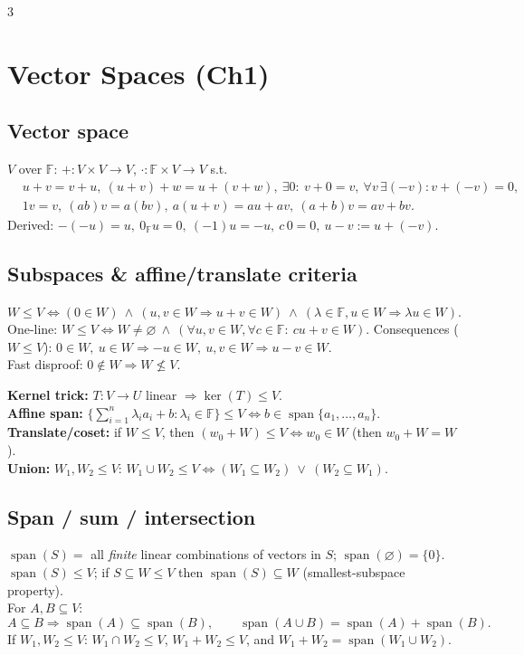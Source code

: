 \documentclass[10pt]{article}
\newcommand{\F}{\mathbb{F}}
\newcommand{\Ker}{\operatorname{ker}}
\newcommand{\spann}{\operatorname{span}}
\begin{document}
\begin{multicols}{3}
\footnotesize
\raggedcolumns

\section*{Vector Spaces (Ch1)}

\subsection*{Vector space}
$V$ over $\F$: $+:V\times V\to V$, $\cdot:\F\times V\to V$ s.t.
\[
\begin{aligned}
&u+v=v+u,\ (u+v)+w=u+(v+w),\ \exists 0:\ v+0=v,\ \forall v\,\exists(-v):v+(-v)=0,\\
&1v=v,\ (ab)v=a(bv),\ a(u+v)=au+av,\ (a+b)v=av+bv.
\end{aligned}
\]
Derived: $-(-u)=u,\ 0_{\F}u=0,\ (-1)u=-u,\ c\,0=0,\ u-v:=u+(-v)$.

\subsection*{Subspaces \& affine/translate criteria}
$W\le V \iff (0\in W)\ \wedge\ (u,v\in W\Rightarrow u+v\in W)\ \wedge\ (\lambda\in\F,u\in W\Rightarrow \lambda u\in W)$.
One-line: $W\le V\iff W\neq\varnothing\ \wedge\ (\forall u,v\in W,\forall c\in\F:\ cu+v\in W)$.
Consequences ($W\le V$): $0\in W,\ u\in W\Rightarrow -u\in W,\ u,v\in W\Rightarrow u-v\in W$.\\
Fast disproof: $0\notin W\Rightarrow W\not\le V$.

\textbf{Kernel trick:} $T:V\to U$ linear $\Rightarrow \Ker(T)\le V$.\\
\textbf{Affine span:} $\{ \sum_{i=1}^n\lambda_i a_i+b:\lambda_i\in\F\}\le V\iff b\in\spann\{a_1,\dots,a_n\}$.\\
\textbf{Translate/coset:} if $W\le V$, then $(w_0+W)\le V\iff w_0\in W$ (then $w_0+W=W$).\\
\textbf{Union:} $W_1,W_2\le V$: $W_1\cup W_2\le V\iff (W_1\subseteq W_2)\ \vee\ (W_2\subseteq W_1)$.

\subsection*{Span / sum / intersection}
$\spann(S)=$ all \emph{finite} linear combinations of vectors in $S$; $\spann(\varnothing)=\{0\}$.\\
$\spann(S)\le V$; if $S\subseteq W\le V$ then $\spann(S)\subseteq W$ (smallest-subspace property).\\
For $A,B\subseteq V$:
\[
A\subseteq B\Rightarrow \spann(A)\subseteq\spann(B),\qquad
\spann(A\cup B)=\spann(A)+\spann(B).
\]
If $W_1,W_2\le V$: $W_1\cap W_2\le V$, $W_1+W_2\le V$, and $W_1+W_2=\spann(W_1\cup W_2)$.


\end{multicols}
\end{document}
